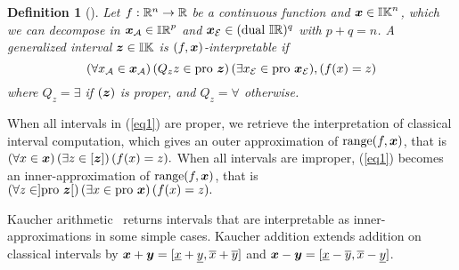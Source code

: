 \documentclass{sig-alternate-05-2015} %
\newtheorem{definition}{Definition}
\DeclareMathOperator{\range}{range}
\newcommand{\pro}{\mbox{pro }}
\def\bbr{{\Bbb R}}
\def\I{{\Bbb I \Bbb R}}
\def\K{{\Bbb I \Bbb K}}
\begin{document}
\begin{definition} [\cite{gold1}]
\label{pb1}
Let $f : \bbr^n \rightarrow \bbr$ be a continuous function and $\x \in \K^n$, which we can decompose in $\x_{\cal A} \in \I^p$ 
and $\x_{\cal E} \in (\mbox{dual }\I)^q$ with $p+q=n$. A generalized interval 
$\z \in \K$ is $(f,\x)$-interpretable if
\begin{equation}
 (\forall x_{\cal A} \in \x_{\cal A})\, (Q_z z \in \pro \z)\, (\exists x_{\cal E} \in \pro \x_{\cal E}),
(f(x)=z)
\label{eq1}
\end{equation}
where $Q_z = \exists$ if $(\z)$ is proper, and  $Q_z = \forall$ otherwise. 
\end{definition}

When all intervals in (\ref{eq1}) are proper, we retrieve the interpretation of classical interval 
computation, which gives an outer approximation of $\range(f,\x)$, that is
$ (\forall x \in \x) \, (\exists z \in [\z]) \, (f(x)=z).    $
When all intervals are improper, (\ref{eq1}) becomes an inner-approx\-imation  of $\range(f,\x)$, that is
$ (\forall z \in ]\pro \z[) \, (\exists x \in \pro \x) \, (f(x)=z).    $

 Kaucher arithmetic~\cite{Kaucher} returns intervals that are interpretable as inner-approximations in some simple cases. 
Kau\-cher addition extends addition on classical intervals by $\x+\y=[\underline x + \underline y,\overline x + \overline y]$ and 
$\x-\y=[\underline x - \overline y,\overline x - \underline y]$.
\end{document}
